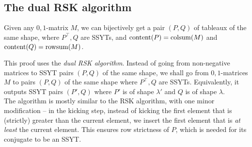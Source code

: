\subsection{The dual RSK algorithm}

	\begin{ftheo}
		Given any $0,1$-matrix $M$, we can bijectively get a pair $(P,Q)$ of tableaux of the same shape, where $P^\top, Q$ are SSYTs, and $\operatorname{content}(P) = \operatorname{colsum}(M)$ and $\operatorname{content}(Q) = \operatorname{rowsum}(M)$.  
	\end{ftheo}

	This proof uses the \emph{dual RSK algorithm}. Instead of going from non-negative matrices to SSYT pairs $(P,Q)$ of the same shape, we shall go from $0,1$-matrices $M$ to pairs $(P,Q)$ of the same shape where $P^\top,Q$ are SSYTs. Equivalently, it outputs SSYT pairs $(P',Q)$ where $P'$ is of shape $\lambda'$ and $Q$ is of shape $\lambda$. \\
	The algorithm is mostly similar to the RSK algorithm, with one minor modification -- in the kicking step, instead of kicking the first element that is (strictly) greater than the current element, we insert the first element that is \emph{at least} the current element. This ensures row strictness of $P$, which is needed for its conjugate to be an SSYT.

